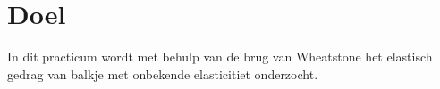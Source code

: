 \section{Doel}

In dit practicum wordt met behulp van de brug van Wheatstone
het elastisch gedrag van balkje met onbekende elasticitiet
onderzocht.
